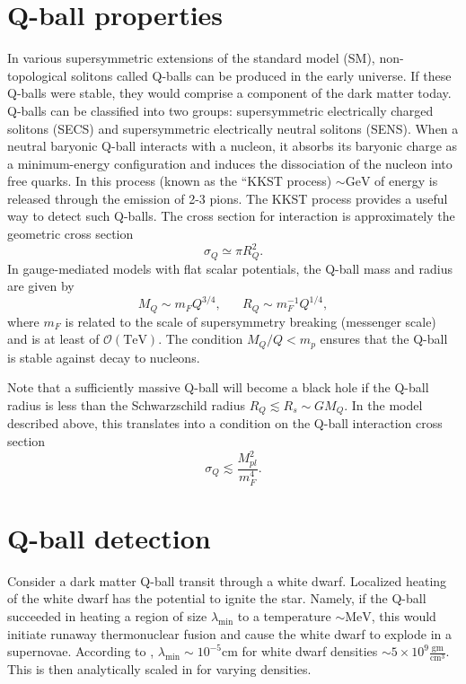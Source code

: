 \documentclass[11 pt, preprint,preprintnumbers,amsmath,amssymb, prd]{revtex4}
\begin{document}
\section{Q-ball properties}
In various supersymmetric extensions of the standard model (SM), non-topological solitons called Q-balls can be produced in the early universe. If these Q-balls were stable, they would comprise a component of the dark matter today. Q-balls can be classified into two groups: supersymmetric electrically charged solitons (SECS) and supersymmetric electrically neutral solitons (SENS). When a neutral baryonic Q-ball interacts with a nucleon, it absorbs its baryonic charge as a minimum-energy configuration and induces the dissociation of the nucleon into free quarks. In this process (known as the ``KKST process) $\sim \text{GeV}$ of energy is released through the emission of 2-3 pions. The KKST process provides a useful way to detect such Q-balls. The cross section for interaction is approximately the geometric cross section
\begin{equation}
\sigma_Q \simeq \pi R_Q^2.
\end{equation}
In gauge-mediated models with flat scalar potentials, the Q-ball mass and radius are given by
\begin{equation}
M_Q \sim m_F Q^{3/4}, \hspace{20pt} R_Q \sim m_F^{-1} Q^{1/4},
\end{equation}
where $m_F$ is related to the scale of supersymmetry breaking (messenger scale) and is at least of $\mathcal{O}(\text{TeV})$. The condition $M_Q/Q < m_p$ ensures that the Q-ball is stable against decay to nucleons. 

Note that a sufficiently massive Q-ball will become a black hole if the Q-ball radius is less than the Schwarzschild radius $R_Q \lesssim R_s \sim G M_Q$. In the model described above, this translates into a condition on the Q-ball interaction cross section 
\begin{equation}
\sigma_Q \lesssim \frac{M_{pl}^2}{m_F^4}. 
\end{equation}

\section{Q-ball detection}
Consider a dark matter Q-ball transit through a white dwarf. Localized heating of the white dwarf has the potential to ignite the star. Namely, if the Q-ball succeeded in heating a region of size $\lambda_\text{min}$ to a temperature $\sim \text{MeV}$, this would initiate runaway thermonuclear fusion and cause the white dwarf to explode in a supernovae. According to \cite{Woosley}, $\lambda_{\text{min}} \sim 10^{-5} \text{cm}$ for white dwarf densities $\sim 5 \times 10^9 \frac{\text{gm}}{\text{cm}^3}$. This is then analytically scaled in \cite{Varela} for varying densities. 
\end{document}
